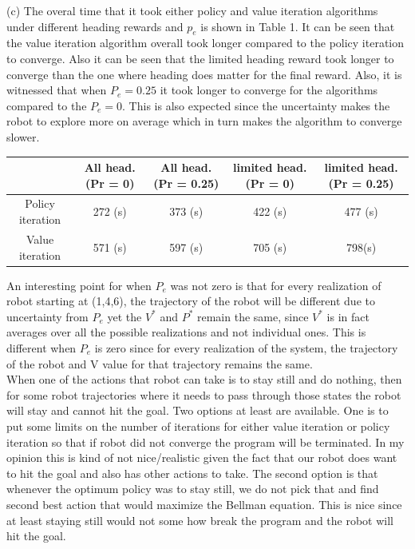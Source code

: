 \documentclass{article}
\begin{document}
	\newpage
	(c) 	The overal time that it took either policy and value iteration algorithms under different heading rewards and $p_{e}$ is shown in Table 1. It can be seen that the value iteration algorithm overall took longer compared to the policy iteration to converge. Also it can be seen that the limited heading reward took longer to converge than the one where heading does matter for the final reward. Also, it is witnessed that when $P_{e} = 0.25$ it took longer to converge for the algorithms compared to the $P_{e} = 0$. This is also expected since the uncertainty makes the robot to explore more on average which in turn makes the algorithm to converge slower.
	\begin{center}
		\begin{tabular}{ |c|c|c|c|c| } 
			\hline
			& All head. (Pr = 0) & All head. (Pr = 0.25) & limited head. (Pr = 0) & limited head. (Pr = 0.25) \\ \hline
			Policy iteration & 272 (s) & 373 (s) & 422 (s) & 477 (s) \\ \hline
			Value iteration & 571 (s) & 597 (s) & 705 (s) & 798(s) \\ \hline
			\hline
		\end{tabular}
	\end{center}
	
	An interesting point for when $P_{e}$ was not zero is that for every realization of robot starting at (1,4,6), the trajectory of the robot will be different due to uncertainty from $P_{e}$ yet the $V^*$ and $P^*$ remain the same, since $V^*$ is in fact averages over all the possible realizations and not individual ones. This is different when $P_{e}$ is zero since for every realization of the system, the trajectory of the robot and V value for that trajectory remains the same. \\ 
	
	When one of the actions that robot can take is to stay still and do nothing, then for some robot trajectories where it needs to pass through those states the robot will stay and cannot hit the goal. Two options at least are available. One is to put some limits on the number of iterations for either value iteration or policy iteration so that if robot did not converge the program will be terminated. In my opinion this is kind of not nice/realistic given the fact that our robot does want to hit the goal and also has other actions to take. The second option is that whenever the optimum policy was to stay still, we do not pick that and find second best action that would maximize the Bellman equation. This is nice since at least staying still would not some how break the program and the robot will hit the goal. \\
	
\end{document}
